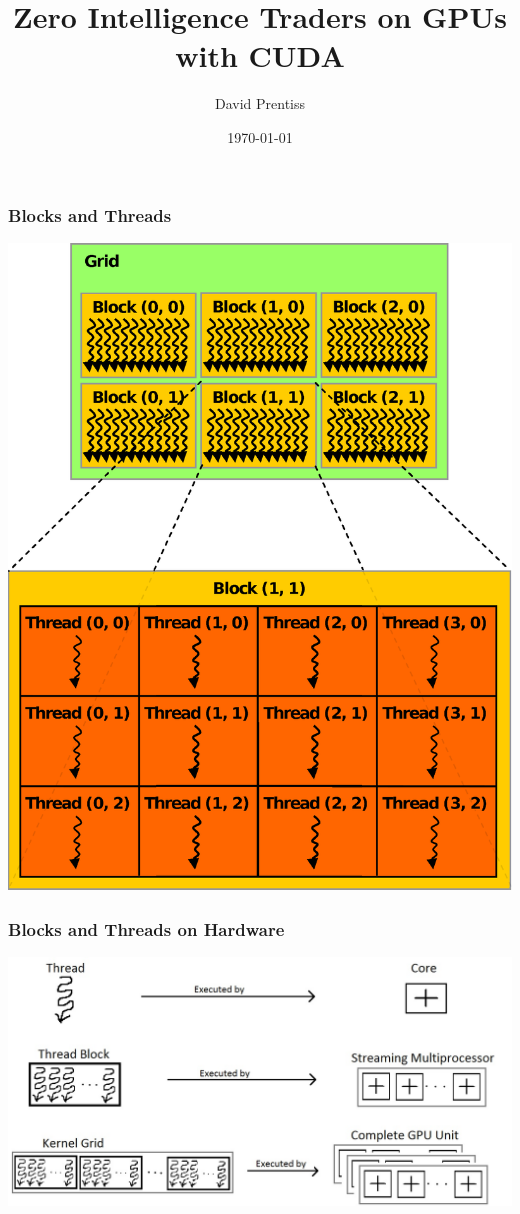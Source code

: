 \documentclass[handout]{beamer}
\begin{document}
\title{Zero Intelligence Traders on GPUs with CUDA}
\author{David Prentiss}
\date{\today}


\frame{\titlepage}

\begin{frame}
  \frametitle{Blocks and Threads}
  \centering
  \includegraphics[height=.9\textheight,keepaspectratio]{block-thread.eps}
\end{frame}

\begin{frame}
  \frametitle{Blocks and Threads on Hardware}
  \centering
  \includegraphics[width=\textwidth,keepaspectratio]{Software-Perspective_for_thread_block.jpg}
\end{frame}
\end{document}
